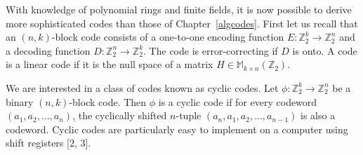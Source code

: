 
With knowledge of polynomial rings and finite fields, it is now possible to derive more sophisticated codes than those of Chapter~\ref{algcodes}.  First let us recall that an $(n, k)$-block code consists of a one-to-one encoding function $E:{\mathbb Z}^{k}_{2} \rightarrow {\mathbb Z}^{n}_{2}$ and a decoding function $D:{\mathbb Z}^{n}_{2} \rightarrow {\mathbb Z}^{k}_{2}$.  The code is error-correcting if $D$ is onto.  A code is a linear code if it is the null space of a matrix $H \in {\mathbb M}_{k \times n}({\mathbb Z}_2)$.  

We are interested in a class of codes known as cyclic codes.  Let $\phi : {\mathbb Z}_2^k \rightarrow {\mathbb  Z}_2^n$ be a binary $(n,k)$-block code.  Then $\phi$ is a {\bfi cyclic code\/} if for every codeword $(a_1, a_2, \ldots, a_n )$, the cyclically shifted $n$-tuple $(a_n, a_1, a_2, \ldots, a_{n-1} )$ is also a codeword.  Cyclic codes are particularly easy to implement on a  computer using shift registers [2, 3].  


